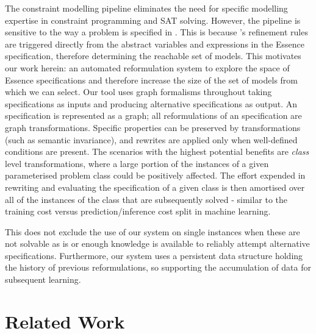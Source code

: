 \documentclass[runningheads]{llncs}
\begin{document}
The constraint modelling pipeline eliminates the need for specific modelling expertise in constraint programming and SAT solving.
However, the pipeline is sensitive to the way a problem is specified in \essence. This is because \conjure's refinement rules are triggered directly from the abstract variables and expressions in the {\sc Essence} specification, therefore determining the reachable set of models.
This motivates our work herein: an automated reformulation system to explore the space of {\sc Essence} specifications and therefore increase the size of the set of models from which we can select. Our tool uses graph formalisms throughout taking \essence specifications as inputs and producing alternative \essence specifications as output. An \essence specification is represented as a graph; all reformulations of an \essence specification are graph transformations. Specific properties can be preserved by transformations (such as semantic invariance), and rewrites are applied only when well-defined conditions are present. The scenarios with the highest potential benefits are \textit{class} level transformations, where a large portion of the instances of a given parameterised problem class could be positively affected. The effort expended in rewriting and evaluating the specification of a given class is then amortised over all of the instances of the class that are subsequently solved - similar to the training cost versus prediction/inference cost split in machine learning.

This does not exclude the use of our system on single instances when these are not solvable as is or enough knowledge is available to reliably attempt alternative specifications. Furthermore, our system uses a persistent data structure holding the history of previous reformulations, so supporting the accumulation of data for subsequent learning.

\section{Related Work}
\end{document}
